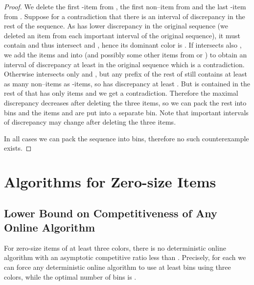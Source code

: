 \documentclass[11pt,a4paper]{article}
\begin{document}
\begin{proof}
We delete the first -item  from , the first non--item  from 
and the last -item  from .
Suppose for a contradiction that there is an interval  of discrepancy
 in the rest of the sequence. As  has lower discrepancy in the original sequence (we deleted an item from each important interval of the original sequence),
it must contain  and thus intersect  and , hence its dominant color is .
If  intersects also , we add the items  and  into 
(and possibly some other items from  or )
to obtain an interval of discrepancy at least  in the original sequence which is a contradiction.
Otherwise  intersects only  and , but any prefix of the rest
of  still contains at least as many non--items as -items,
so  has discrepancy at least . But  is contained in 
the rest of  that has only  items and we get a contradiction.
Therefore the maximal discrepancy decreases after deleting the three items,
so we can pack the rest into  bins and the items  and  are put into a separate bin.
Note that important intervals of discrepancy  may change after deleting the three items.

In all cases we can pack the sequence into  bins, therefore no such counterexample exists.
\end{proof}

\section{Algorithms for Zero-size Items}\label{sec:zeroSize}

\subsection{Lower Bound on Competitiveness of Any Online Algorithm}\label{sec:zeroSizeLB}

\begin{theorem}
\label{thm:LBforColors}
For zero-size items of at least three colors,
there is no deterministic online algorithm with an asymptotic competitive ratio less than .
Precisely, for each  we can force any deterministic online algorithm to use at least  bins using three colors,
while the optimal number of bins is .
\end{theorem}
\end{document}
